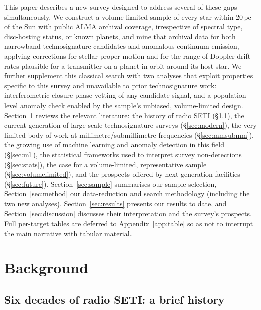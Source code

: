 \documentclass{openjournal}
\begin{document}
This paper describes a new survey designed to address several of these gaps
simultaneously. We construct a volume-limited sample of every star within
20\,pc of the Sun with public ALMA archival coverage, irrespective of
spectral type, disc-hosting status, or known planets, and mine that
archival data for both narrowband technosignature candidates and
anomalous continuum emission, applying corrections for stellar proper
motion and for the range of Doppler drift rates plausible for a
transmitter on a planet in orbit around its host star. We further
supplement this classical search with two analyses that exploit
properties specific to this survey and unavailable to prior
technosignature work: interferometric closure-phase vetting of any
candidate signal, and a population-level anomaly check enabled by the
sample's unbiased, volume-limited design.
Section~\ref{sec:background} reviews the relevant
literature: the history of radio SETI (\S\ref{sec:history}), the current
generation of large-scale technosignature surveys (\S\ref{sec:modern}), the very
limited body of work at millimetre/submillimetre frequencies
(\S\ref{sec:mmsubmm}), the growing use of machine learning and anomaly detection
in this field (\S\ref{sec:ml}), the statistical frameworks used to interpret
survey non-detections (\S\ref{sec:stats}), the case for a volume-limited,
representative sample (\S\ref{sec:volumelimited}), and the prospects offered by
next-generation facilities (\S\ref{sec:future}). Section~\ref{sec:sample}
summarises our sample selection, Section~\ref{sec:method} our data-reduction and
search methodology (including the two new analyses),
Section~\ref{sec:results} presents our results to date, and
Section~\ref{sec:discussion} discusses their interpretation and the survey's
prospects. Full per-target tables are deferred to Appendix~\ref{app:table}
so as not to interrupt the main narrative with tabular material.

\section{Background}
\label{sec:background}

\subsection{Six decades of radio SETI: a brief history}
\label{sec:history}
\end{document}
